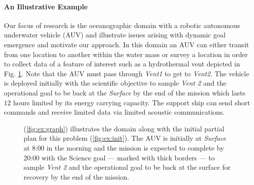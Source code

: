 \paragraph{An Illustrative Example} 
Our focus of research is the oceanographic domain with a robotic
autonomous underwater vehicle (AUV) and illustrate issues arising with
dynamic goal emergence and motivate our approach.  In this domain an AUV
can either transit from one location to another within the water mass
or survey a location in order to collect data of a feature of interest
such as a hydrothermal vent depicted in Fig. \ref{fig:Example}.  Note that
the AUV must pass through {\em Vent1} to get to {\em Vent2}.  The
vehicle is deployed initially with the scientific objective to sample
{\em Vent 2} and the operational goal to be back at the {\em Surface}
by the end of the mission which lasts $12$ hours limited by its energy
carrying capacity. The support ship can send short commands and
receive limited data via limited acoustic communications.

\begin{figure}[!t]
  \centering
  \hfill {}
  \caption{\small{(\ref{fig:ex:graph}) illustrates the domain along
      with the initial partial plan for this problem
      (\ref{fig:ex:init}). The AUV is initially at {\em Surface} at
      8:00 in the morning and the mission is expected to complete by 20:00 with the
      Science goal --- marked with thick borders --- to sample {\em
        Vent 2} and the operational goal to be back at the surface
      for recovery by the end of the mission.}}
\label{fig:Example}
\end{figure}

